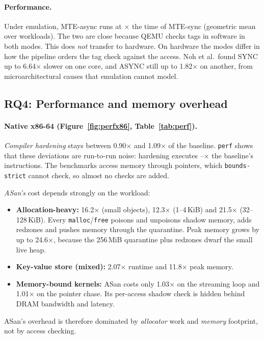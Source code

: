 \documentclass[11pt,a4paper]{article}
\begin{document}
\paragraph{Performance.}
Under emulation, MTE-async runs at \AsyncVsSync$\times$ the time of MTE-sync (geometric mean over workloads).
The two are close because QEMU checks tags in software in both modes.
This does \emph{not} transfer to hardware.
On hardware the modes differ in how the pipeline orders the tag check against the access.
Noh et al.\ found SYNC up to 6.64$\times$ slower on one core, and ASYNC still up to 1.82$\times$ on another, from microarchitectural causes that emulation cannot model.

\subsection{RQ4: Performance and memory overhead}
\label{sec:perf}
\paragraph{Native x86-64 (Figure~\ref{fig:perfx86}, Table~\ref{tab:perf}).}
\emph{Compiler hardening} stays between 0.90$\times$ and 1.09$\times$ of the baseline.
\texttt{perf} shows that these deviations are run-to-run noise: hardening executes \HardInstrMin--\HardInstrMax$\times$ the baseline's instructions.
The benchmarks access memory through pointers, which \texttt{bounds-strict} cannot check, so almost no checks are added.

\emph{ASan's} cost depends strongly on the workload:
\begin{itemize}[itemsep=1pt]
\item \textbf{Allocation-heavy:} 16.2$\times$ (small objects), 12.3$\times$ (1--4\,KiB) and 21.5$\times$ (32--128\,KiB).
Every \texttt{malloc}/\texttt{free} poisons and unpoisons shadow memory, adds redzones and pushes memory through the quarantine.
Peak memory grows by up to 24.6$\times$, because the 256\,MiB quarantine plus redzones dwarf the small live heap.
\item \textbf{Key-value store (mixed):} 2.07$\times$ runtime and 11.8$\times$ peak memory.
\item \textbf{Memory-bound kernels:} ASan costs only 1.03$\times$ on the streaming loop and 1.01$\times$ on the pointer chase.
Its per-access shadow check is hidden behind DRAM bandwidth and latency.
\end{itemize}
ASan's overhead is therefore dominated by \emph{allocator} work and \emph{memory} footprint, not by access checking.
\end{document}
